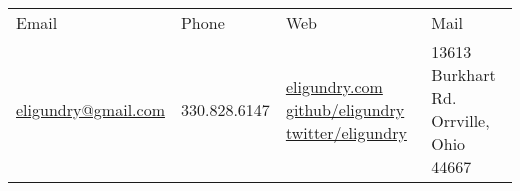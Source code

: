 \begin{tabu} to \linewidth { X X X X }
	\rowfont{\smaller\bfseries}
	Email & Phone & Web & Mail \\
	\rowfont{\smaller}
	\href{mailto:eligundry@gmail.com}{eligundry@gmail.com} &
	330.828.6147 &
	\href{https://eligundry.com}{eligundry.com} \newline
	\href{https://github.com/eligundry}{github/eligundry} \newline
	\href{https://twitter.com/EliGundry}{twitter/eligundry} &
	13613 Burkhart Rd.\newline
	Orrville, Ohio 44667 \\
\end{tabu}
